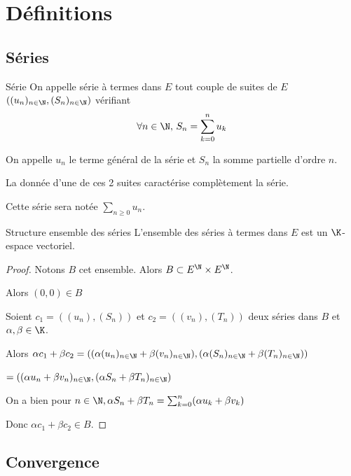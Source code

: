 
\section{Définitions }
\subsection{Séries}

\begin{definition}{Série}{}
    On appelle série à termes dans $E$ tout couple de suites de $E$ $\left( (u_n)_{n\in\N}, (S_n)_{n\in\N} \right)$ vérifiant 
    $$\forall n \in \N, \, S_n = \sum_{k=0}^n u_k$$

    On appelle $u_n$ le terme général de la série et $S_n$ la somme partielle d'ordre $n$.

    La donnée d'une de ces 2 suites caractérise complètement la série. 

    Cette série sera notée $\sum_{n \geqslant 0} u_n$.
\end{definition}

\begin{proposition}{Structure ensemble des séries}{}
    L'ensemble des séries à termes dans $E$ est un $\K$-espace vectoriel.
\end{proposition}

\begin{proof}
    Notons $B$ cet ensemble. Alors $B \subset E^\N \times E^\N$.

    Alors $(0, 0) \in B$

    Soient $c_1 = \left( (u_n), (S_n) \right)$ et $c_2 = \left( (v_n), (T_n) \right)$ 
    deux séries dans $B$ et $\alpha, \beta \in \K$. 

    Alors $\alpha c_1 + \beta c_2 = \left( (\alpha(u_n)_{n \in \N} + \beta(v_n)_{n \in \N}), (\alpha(S_n)_{n \in \N} + \beta(T_n)_{n \in \N}) \right)$

    $ = \left( (\alpha u_n + \beta v_n)_{n \in \N}, (\alpha S_n + \beta T_n)_{n \in \N} \right)$

    On a bien pour $n \in \N, \alpha S_n + \beta T_n = \sum_{k=0}^n (\alpha u_k + \beta v_k)$

    Donc $\alpha c_1 + \beta c_2 \in B$.

\end{proof}

\subsection{Convergence }

